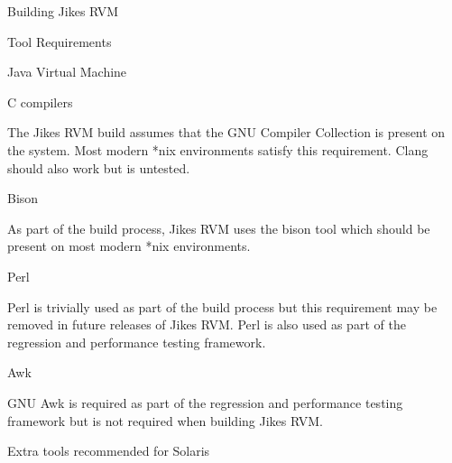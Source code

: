\begin{section}{Building Jikes RVM}
\begin{subsection}{Tool Requirements}
\begin{subsubsection}{Java Virtual Machine}
\end{subsubsection}


\begin{subsubsection}{C compilers}

The Jikes RVM build assumes that the GNU Compiler Collection is present on the system. Most modern *nix environments satisfy this requirement. Clang should also work but is untested.

\end{subsubsection}

\begin{subsubsection}{Bison}

As part of the build process, Jikes RVM uses the bison tool which should be present on most modern *nix environments.

\end{subsubsection}

\begin{subsubsection}{Perl}

Perl is trivially used as part of the build process but this requirement may be removed in future releases of Jikes RVM. Perl is also used as part of the regression and performance testing framework.

\end{subsubsection}

\begin{subsubsection}{Awk}

GNU Awk is required as part of the regression and performance testing framework but is not required when building Jikes RVM.

\end{subsubsection}

\end{subsection}

\begin{subsubsection}{Extra tools recommended for Solaris}


\end{subsubsection}
\end{section}
